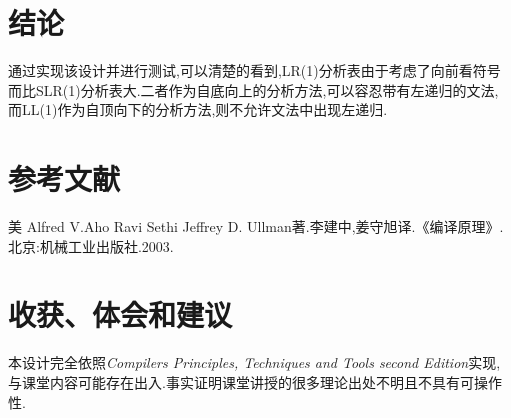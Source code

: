 \documentclass[11pt]{article}
\begin{document}
\section{结论}
通过实现该设计并进行测试,可以清楚的看到,LR(1)分析表由于考虑了向前看符号而比SLR(1)分析表大.二者作为自底向上的分析方法,可以容忍带有左递归的文法,而LL(1)作为自顶向下的分析方法,则不允许文法中出现左递归.

\section{参考文献}
美 Alfred V.Aho Ravi Sethi Jeffrey D. Ullman著.李建中,姜守旭译.《编译原理》.北京:机械工业出版社.2003.

\section{收获、体会和建议}
本设计完全依照\emph{Compilers Principles, Techniques and Tools second Edition}实现,与课堂内容可能存在出入.事实证明课堂讲授的很多理论出处不明且不具有可操作性.
\end{document}
